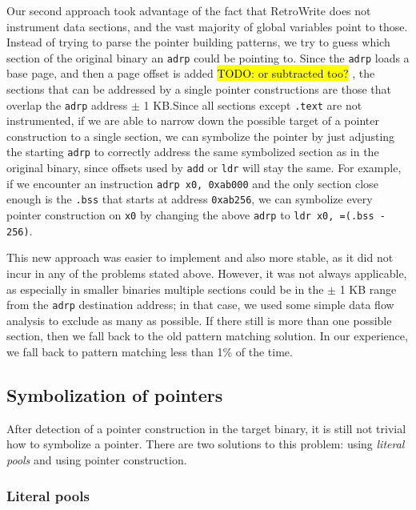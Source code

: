\documentclass[a4paper,11pt,oneside]{report}
\newcommand{\sysname}{RetroWrite\xspace}
\newcommand{\todo}[1]{%
	\begingroup 
	\sethlcolor{cyan}%
	\hl{TODO: #1}%
	\endgroup
}
\begin{document}
Our second approach took advantage of the fact that \sysname does not 
instrument data sections, and the vast majority of global variables point to 
those. Instead of trying to parse the pointer building patterns, we try to 
guess which section of the original binary an \texttt{adrp} could be pointing 
to. Since the \texttt{adrp} loads a base page, and then a page offset is added 
\todo{or subtracted too?}, the sections that can be addressed by a single 
pointer constructions are those that overlap the \texttt{adrp} address $\pm$ 1 
KB.\@ Since all sections except \texttt{.text} are not instrumented, if we are 
able to narrow down the possible target of a pointer construction to a single 
section, we can symbolize the pointer by just adjusting the starting 
\texttt{adrp} to correctly address the same symbolized section as in the 
original binary, since offsets used by \texttt{add} or \texttt{ldr} will stay 
the same.
For example, if we encounter an instruction \texttt{adrp x0, 0xab000} and the
only section close enough is the \texttt{.bss} that starts at address
\texttt{0xab256}, we can symbolize every pointer construction on \texttt{x0} by
changing the above \texttt{adrp} to \texttt{ldr x0, =(.bss - 256)}.

This new approach was easier to implement and also more stable, as it did not
incur in any of the problems stated above. However, it was not always
applicable, as especially in smaller binaries multiple sections could be in the
$\pm$ 1 KB range from the \texttt{adrp} destination address; in that case, we
used some simple data flow analysis to exclude as many as possible. If there 
still is more than one possible section, then we fall back to the old pattern 
matching solution. In our experience, we fall back to pattern matching less 
than 1\% of the time.

\subsection{Symbolization of pointers}

After detection of a pointer construction in the target binary, it is still not 
trivial how to symbolize a pointer. There are two solutions to this problem: 
using \emph{literal pools} and using pointer construction.

\subsubsection{Literal pools}
\end{document}
